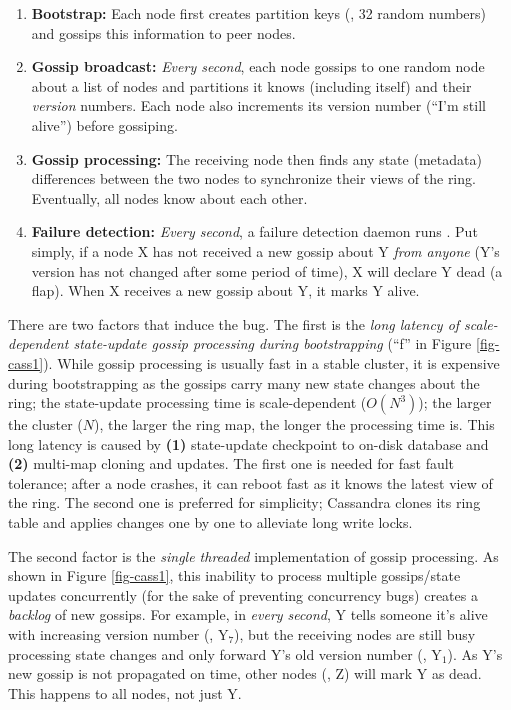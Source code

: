\begin{enumerate}

\item {\bf Bootstrap:} Each node first creates partition keys (\eg, 32
random numbers) and gossips this information to peer nodes.
 
\item {\bf Gossip broadcast:} {\em Every second}, each node gossips to one
random node about a list of nodes and partitions it knows (including
itself) and their {\em version} numbers.  Each node also increments its
version number (``I'm still alive'') before gossiping.
 
\item {\bf Gossip processing:} The receiving node then finds any state
(metadata) differences between the two nodes to synchronize their views of
the ring.  Eventually, all nodes know about each other.
 
\item {\bf Failure detection:} {\em Every second}, a failure detection
daemon runs \cite{Lakshman+09-Cassandra}.  Put simply, if a node X has not
received a new gossip about Y {\em from anyone} (Y's version has not
changed after some period of time), X will declare Y dead (a flap).  When
X receives a new gossip about Y, it marks Y alive.

\end{enumerate}



There are two factors that induce the bug.  The
first is the {\em long latency of scale-dependent state-update gossip
  processing during bootstrapping} (``f'' in Figure \ref{fig-cass1}).  
While gossip processing is
usually fast in a stable cluster, it is expensive during bootstrapping as
the gossips carry many new state changes about the ring; the state-update
processing time is scale-dependent ($O(N^3)$); the larger the cluster ($N$), 
the larger the ring map, the longer the processing time is.
%
This long latency is caused by {\bf (1)} state-update checkpoint to on-disk
database and {\bf (2)} multi-map cloning and updates.
%
The first one is needed for fast fault tolerance; after a node crashes, it
can reboot fast as it knows the latest view of the ring.
%
The second one is preferred for simplicity; Cassandra clones its
 ring table and applies changes one by one to alleviate 
long write locks.
%

The second factor is the {\em single threaded} implementation of gossip
processing.  As shown in Figure \ref{fig-cass1},  this inability to process
multiple gossips/state updates concurrently 
(for the sake of preventing concurrency bugs) creates a {\em backlog} of new 
gossips.  For
example, in {\em every second}, Y tells someone it's alive with increasing
version number (\eg, Y$_7$), but the receiving nodes are still busy
processing state changes and only forward Y's old version number (\eg,
Y$_1$).  As Y's new gossip is not propagated on time,  other nodes
(\eg, Z) will mark Y as dead.  This happens to all
nodes, not just Y.







%
